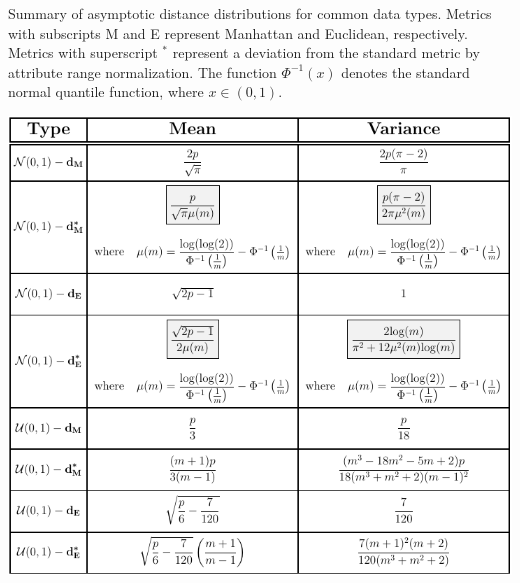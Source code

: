 \documentclass[10pt,letterpaper]{article}\usepackage[]{graphicx}\usepackage[]{color}
\begin{document}
\begin{table}[H]
\caption{Summary of asymptotic distance distributions for common data types. Metrics with subscripts M and E represent Manhattan and Euclidean, respectively. Metrics with superscript $^*$ represent a deviation from the standard metric by attribute range normalization. The function $\Phi^{-1}(x)$ denotes the standard normal quantile function, where $x \in (0,1)$.}
\label{tab:dist_distr_common}
\centering
\includegraphics[width=\textwidth]{typical_data-metric_tab.pdf}
\end{table}
\end{document}
